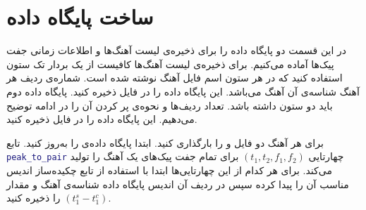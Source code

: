 \documentclass{utsignal}
\begin{document}
	\section{ساخت پایگاه داده}
	در این قسمت دو پایگاه داده را برای ذخیره‌ی لیست آهنگ‌ها و اطلاعات زمانی جفت پیک‌ها آماده می‌کنیم. برای ذخیره‌ی لیست آهنگ‌ها کافیست از یک بردار تک ستون استفاده کنید که در هر ستون اسم فایل آهنگ نوشته شده است. شماره‌ی ردیف هر آهنگ شناسه‌ی آن آهنگ می‌باشد. این پایگاه داده را در فایل  ذخیره کنید. پایگاه داده دوم  باید دو ستون داشته باشد. تعداد ردیف‌ها و نحوه‌ی پر کردن آن را در ادامه توضیح می‌دهیم. این پایگاه داده را در فایل  ذخیره کنید. 
	
	برای هر آهنگ دو فایل  و  را بارگذاری کنید. ابتدا پایگاه داده‌ی  را به‌روز کنید. تابع \lstinline[language=Matlab]{peak_to_pair} چهارتایی $(t_1, t_2, f_1, f_2)$ برای تمام جفت پیک‌های یک آهنگ را تولید می‌کند. برای هر کدام از این چهار‌تایی‌ها ابتدا با استفاده از تابع چکیده‌ساز اندیس 
	 مناسب آن را پیدا کرده سپس در ردیف آن اندیس پایگاه داده  شناسه‌ی آهنگ و مقدار $(t_1^s-t_1^c)$ را ذخیره کنید.
\end{document}
